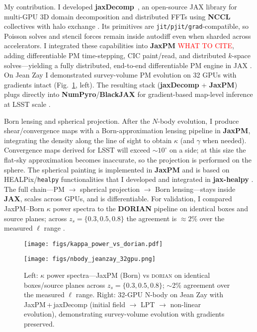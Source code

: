 \documentclass{article}
\newcommand{\wk}[1]{\textcolor{red}{#1}}
\begin{document}
My contribution. I developed \textbf{jaxDecomp}~\citep{jaxDecomp}, an open-source JAX library for multi-GPU 3D domain decomposition and distributed FFTs using \textbf{NCCL} collectives with halo exchange \citep{NCCL}. Its primitives are \verb|jit/pjit/grad|-compatible, so Poisson solves and stencil forces remain inside autodiff even when sharded across accelerators. I integrated these capabilities into \textbf{JaxPM} \wk{WHAT TO CITE}, adding differentiable PM time-stepping, CIC paint/read, and distributed \(k\)-space solves—yielding a fully distributed, end-to-end differentiable PM engine in JAX \citep{Bradbury2018JAX}. On Jean Zay I demonstrated survey-volume PM evolution on 32 GPUs with gradients intact (Fig.~\ref{fig:lss-two}, left). The resulting stack (\textbf{jaxDecomp} + \textbf{JaxPM}) plugs directly into \textbf{NumPyro}/\textbf{BlackJAX} for gradient-based map-level inference at LSST scale \citep{NumPyro,BlackJAX}.

Born lensing and spherical projection. After the \(N\)-body evolution, I produce shear/convergence maps with a Born-approximation lensing pipeline in \textbf{JaxPM}, integrating the density along the line of sight to obtain \(\kappa\) (and \(\gamma\) when needed). Convergence maps derived for LSST will exceed \(\sim 10^\circ\) on a side; at this size the flat-sky approximation becomes inaccurate, so the projection is performed on the sphere. The spherical painting is implemented in \textbf{JaxPM} and is based on HEALPix/\texttt{healpy} functionalities that I developed and integrated in \textbf{jax-healpy} \citep{Gorski2005,healpy,jax-healpy}. The full chain—PM \(\rightarrow\) spherical projection \(\rightarrow\) Born lensing—stays inside \textbf{JAX}, scales across GPUs, and is differentiable. For validation, I compared JaxPM–Born \(\kappa\) power spectra to the \textbf{DORIAN} pipeline on identical boxes and source planes; across \(z_s=\{0.3,0.5,0.8\}\) the agreement is \(\approx 2\%\) over the measured \(\ell\) range \citep{DORIAN}.

\begin{figure}[!t]
  \centering
  \begin{minipage}[t]{0.49\linewidth}
    \centering
    \texttt{[image: figs/kappa\_power\_vs\_dorian.pdf]}
  \end{minipage}\hfill
  \begin{minipage}[t]{0.49\linewidth}
    \centering
    \texttt{[image: figs/nbody\_jeanzay\_32gpu.png]}
  \end{minipage}
  \caption{Left: $\kappa$ power spectra—JaxPM (Born) vs \textsc{dorian} on identical
  boxes/source planes across $z_s=\{0.3,0.5,0.8\}$; $\sim$2\% agreement over the measured
  $\ell$ range. Right: 32-GPU N-body on Jean Zay with JaxPM\,+\,jaxDecomp
  (initial field $\rightarrow$ LPT $\rightarrow$ non-linear evolution), demonstrating
  survey-volume evolution with gradients preserved.}
  \label{fig:lss-two}
\end{figure}
\end{document}
